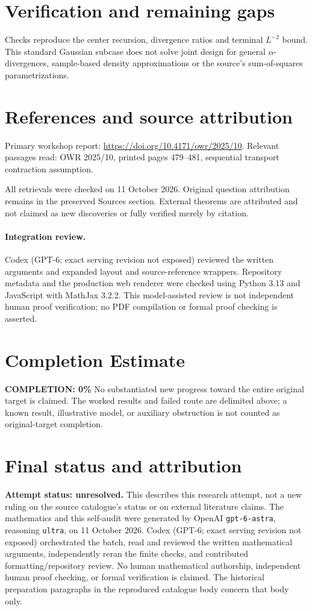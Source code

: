 \documentclass[11pt]{article}
\begin{document}
\section{Verification and remaining gaps}
Checks reproduce the center recursion, divergence ratios and terminal $L^{-2}$ bound. This standard Gaussian subcase does not solve joint design for general $\alpha$-divergences, sample-based density approximations or the source's sum-of-squares parametrizations.

\section{References and source attribution}
Primary workshop report: \url{https://doi.org/10.4171/owr/2025/10}. Relevant passages read: OWR 2025/10, printed pages 479--481, sequential transport contraction assumption.

All retrievals were checked on 11 October 2026. Original question attribution remains in the preserved Sources section. External theorems are attributed and not claimed as new discoveries or fully verified merely by citation.


\paragraph{Integration review.} Codex (GPT-6; exact serving revision not exposed) reviewed the written arguments and expanded layout and source-reference wrappers. Repository metadata and the production web renderer were checked using Python 3.13 and JavaScript with MathJax 3.2.2. This model-assisted review is not independent human proof verification; no PDF compilation or formal proof checking is asserted.

\section{Completion Estimate}
\noindent\textbf{COMPLETION: 0\%}
No substantiated new progress toward the entire original target is claimed. The worked results and failed route are delimited above; a known result, illustrative model, or auxiliary obstruction is not counted as original-target completion.

\section{Final status and attribution}
\textbf{Attempt status: unresolved.} This describes this research attempt, not a new ruling on the source catalogue's status or on external literature claims.
The mathematics and this self-audit were generated by OpenAI \texttt{gpt-6-astra}, reasoning \texttt{ultra}, on 11 October 2026. Codex (GPT-6; exact serving revision not exposed) orchestrated the batch, read and reviewed the written mathematical arguments, independently reran the finite checks, and contributed formatting/repository review. No human mathematical authorship, independent human proof checking, or formal verification is claimed. The historical preparation paragraphs in the reproduced catalogue body concern that body only.
\end{document}
